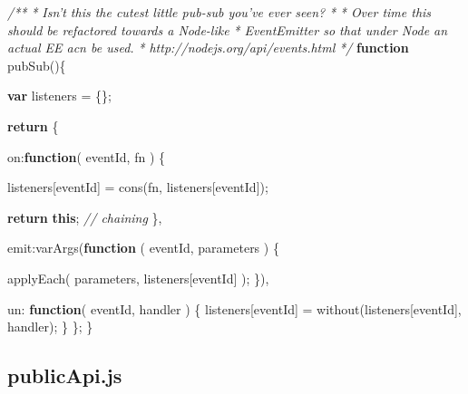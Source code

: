 \documentclass[12pt, ]{article}
\newenvironment{Shaded}{}{}
\newcommand{\KeywordTok}[1]{\textcolor[rgb]{0.00,0.44,0.13}{\textbf{{#1}}}}
\newcommand{\DataTypeTok}[1]{\textcolor[rgb]{0.56,0.13,0.00}{{#1}}}
\newcommand{\CommentTok}[1]{\textcolor[rgb]{0.38,0.63,0.69}{\textit{{#1}}}}
\newcommand{\FunctionTok}[1]{\textcolor[rgb]{0.02,0.16,0.49}{{#1}}}
\newcommand{\NormalTok}[1]{{#1}}
\begin{document}
\begin{Shaded}
\begin{Highlighting}[]
\CommentTok{/**}
\CommentTok{ * Isn't this the cutest little pub-sub you've ever seen?}
\CommentTok{ * }
\CommentTok{ * Over time this should be refactored towards a Node-like}
\CommentTok{ *    EventEmitter so that under Node an actual EE acn be used.}
\CommentTok{ *    http://nodejs.org/api/events.html}
\CommentTok{ */}
\KeywordTok{function} \FunctionTok{pubSub}\NormalTok{()\{}

   \KeywordTok{var} \NormalTok{listeners = \{\};}
                             
   \KeywordTok{return} \NormalTok{\{}

      \DataTypeTok{on}\NormalTok{:}\KeywordTok{function}\NormalTok{( eventId, fn ) \{}
         
         \NormalTok{listeners[eventId] = }\FunctionTok{cons}\NormalTok{(fn, listeners[eventId]);}

         \KeywordTok{return} \KeywordTok{this}\NormalTok{; }\CommentTok{// chaining}
      \NormalTok{\}, }
    
      \DataTypeTok{emit}\NormalTok{:}\FunctionTok{varArgs}\NormalTok{(}\KeywordTok{function} \NormalTok{( eventId, parameters ) \{}
                                             
         \FunctionTok{applyEach}\NormalTok{( }
            \NormalTok{parameters, }
            \NormalTok{listeners[eventId]}
         \NormalTok{);}
      \NormalTok{\}),}
      
      \DataTypeTok{un}\NormalTok{: }\KeywordTok{function}\NormalTok{( eventId, handler ) \{}
         \NormalTok{listeners[eventId] = }\FunctionTok{without}\NormalTok{(listeners[eventId], handler);}
      \NormalTok{\}           }
   \NormalTok{\};}
\NormalTok{\}}
\end{Highlighting}
\end{Shaded}

\pagebreak

\subsection{publicApi.js}\label{headerux5fpublicApi}

\label{src_publicApi}
\end{document}
